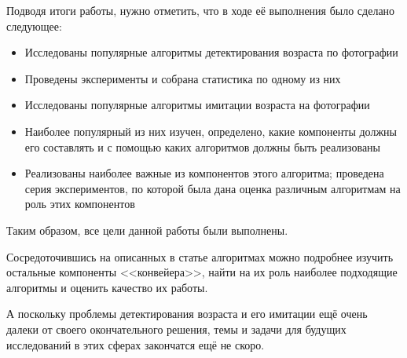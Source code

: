 \newpage
{}

Подводя итоги работы, нужно отметить, что в ходе её выполнения было сделано следующее:

\begin{itemize}
\item Исследованы популярные алгоритмы детектирования возраста по фотографии
\item Проведены эксперименты и собрана статистика по одному из них
\item Исследованы популярные алгоритмы имитации возраста на фотографии
\item Наиболее популярный из них изучен, определено, какие компоненты должны его составлять и с помощью каких алгоритмов должны быть реализованы
\item Реализованы наиболее важные из компонентов этого алгоритма; проведена серия экспериментов, по которой была дана оценка различным алгоритмам на роль этих компонентов
\end{itemize}

Таким образом, все цели данной работы были выполнены.

Сосредоточившись на описанных в статье алгоритмах можно подробнее изучить остальные компоненты <<конвейера>>, найти на их роль наиболее подходящие алгоритмы и оценить качество их работы.

А поскольку проблемы детектирования возраста и его имитации ещё очень далеки от своего окончательного решения, темы и задачи для будущих исследований в этих сферах закончатся ещё не скоро. 